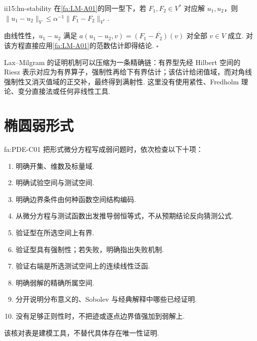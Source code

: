 \begin{FACorollary}{ii15:lm-stability}
在\autoref{fa:LM-A01}的同一型下，若 \(\displaystyle F_1,F_2\in V^*\) 对应解 \(\displaystyle u_1,u_2\)，则 \(\displaystyle \|u_1-u_2\|_V \leqslant \alpha^{-1}\|F_1-F_2\|_{V^*}.\)
\end{FACorollary}

\begin{FAProof}
由线性性，\(\displaystyle u_1-u_2\) 满足 \(\displaystyle a(u_1-u_2,v)=\overline{(F_1-F_2)(v)}\) 对全部 \(\displaystyle v\in V\) 成立. 对该方程直接应用\autoref{fa:LM-A01}的范数估计即得结论.
\hfill\(\square\)
\end{FAProof}

Lax--Milgram 的证明机制可以压缩为一条精确链：有界型先经 Hilbert 空间的 Riesz 表示对应为有界算子，强制性再给下有界估计；该估计给闭值域，而对角线强制性又消灭值域的正交补，最终得到满射性. 这里没有使用紧性、Fredholm 理论、变分直接法或任何非线性工具.

\section{椭圆弱形式}\label{sec:ii15-elliptic-weak-form}

\begin{FAProposition}[C][弱偏微分方程建模检查工具]{fa:PDE-C01}
把形式微分方程写成弱问题时，依次检查以下十项：
\begin{enumerate}[label=\textup{(\arabic*)}]
\item 明确开集、维数及标量域.
\item 明确试验空间与测试空间.
\item 明确边界条件由何种函数空间结构编码.
\item 从微分方程与测试函数出发推导弱恒等式，不从预期结论反向猜测公式.
\item 验证型在所选空间上有界.
\item 验证型具有强制性；若失败，明确指出失败机制.
\item 验证右端是所选测试空间上的连续线性泛函.
\item 明确弱解的精确所属空间.
\item 分开说明分布意义的、Sobolev 与经典解释中哪些已经证明.
\item 没有足够正则性时，不把迹或逐点边界值强加到弱解上.
\end{enumerate}
该核对表是建模工具，不替代具体存在唯一性证明.
\end{FAProposition}

